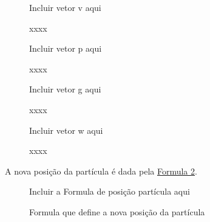                 \begin{figure}[!htb]
                    \begin{minipage}{\textwidth}

                        \begin{minipage}{0.48\textwidth}
                            \centering
                            \small{Incluir vetor v aqui}
                            \caption{xxxx}
                            \label{fig:vetor-v}
                        \end{minipage}
                        \begin{minipage}{0.48\textwidth}
                            \centering
                            \small{Incluir vetor p aqui}
                            \caption{xxxx}
                            \label{fig:vetor-p}
                        \end{minipage}

                        \begin{minipage}{0.48\textwidth}
                            \centering
                            \small{Incluir vetor g aqui}
                            \caption{xxxx}
                            \label{fig:vetor-g}
                        \end{minipage}
                        \begin{minipage}{0.48\textwidth}
                            \centering
                            \small{Incluir vetor w aqui}
                            \caption{xxxx}
                            \label{fig:vetor-w}
                        \end{minipage}

                    \end{minipage}
                \end{figure}

                \noindent A nova posição da partícula é dada pela 
                \hyperref[fig:formula-nova-posicao]{Formula \ref{fig:formula-nova-posicao}}.
                
                \begin{figure}[ht]
                    \centering
                    \small{Incluir a Formula de posição partícula aqui}
                    \caption{Formula que define a nova posição da partícula}
                    \label{fig:formula-nova-posicao}
                \end{figure}

